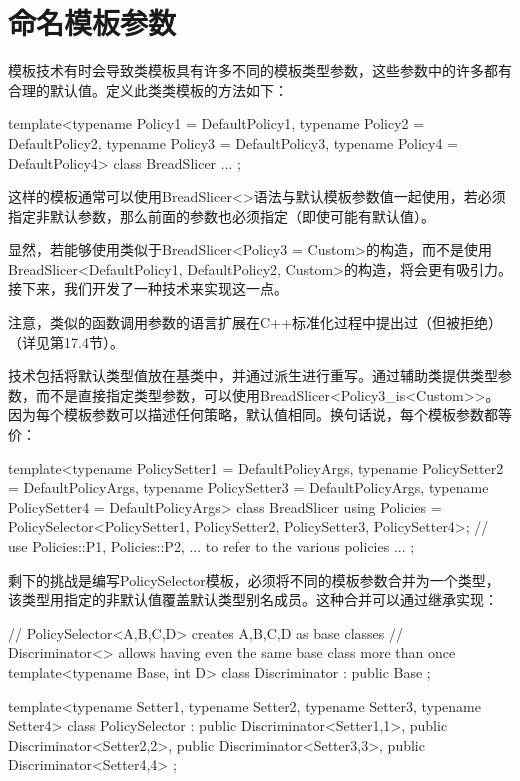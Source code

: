 \section{命名模板参数}
模板技术有时会导致类模板具有许多不同的模板类型参数，这些参数中的许多都有合理的默认值。定义此类类模板的方法如下：

\begin{cpp}
template<typename Policy1 = DefaultPolicy1,
		typename Policy2 = DefaultPolicy2,
		typename Policy3 = DefaultPolicy3,
		typename Policy4 = DefaultPolicy4>
class BreadSlicer {
	...
};
\end{cpp}

这样的模板通常可以使用BreadSlicer<>语法与默认模板参数值一起使用，若必须指定非默认参数，那么前面的参数也必须指定（即使可能有默认值）。

显然，若能够使用类似于BreadSlicer<Policy3 = Custom>的构造，而不是使用BreadSlicer<DefaultPolicy1, DefaultPolicy2, Custom>的构造，将会更有吸引力。接下来，我们开发了一种技术来实现这一点。

\begin{notice}
注意，类似的函数调用参数的语言扩展在C++标准化过程中提出过（但被拒绝）（详见第17.4节）。
\end{notice}

技术包括将默认类型值放在基类中，并通过派生进行重写。通过辅助类提供类型参数，而不是直接指定类型参数，可以使用BreadSlicer<Policy3\_is<Custom>{}>。因为每个模板参数可以描述任何策略，默认值相同。换句话说，每个模板参数都等价：

\begin{cpp}
template<typename PolicySetter1 = DefaultPolicyArgs,
		typename PolicySetter2 = DefaultPolicyArgs,
		typename PolicySetter3 = DefaultPolicyArgs,
		typename PolicySetter4 = DefaultPolicyArgs>
class BreadSlicer {
	using Policies = PolicySelector<PolicySetter1, PolicySetter2,
									PolicySetter3, PolicySetter4>;
	// use Policies::P1, Policies::P2, ... to refer to the various policies
	...
};
\end{cpp}

剩下的挑战是编写PolicySelector模板，必须将不同的模板参数合并为一个类型，该类型用指定的非默认值覆盖默认类型别名成员。这种合并可以通过继承实现：

\begin{cpp}
// PolicySelector<A,B,C,D> creates A,B,C,D as base classes
// Discriminator<> allows having even the same base class more than once
template<typename Base, int D>
class Discriminator : public Base {};

template<typename Setter1, typename Setter2,
		typename Setter3, typename Setter4>
class PolicySelector : public Discriminator<Setter1,1>,
						public Discriminator<Setter2,2>,
						public Discriminator<Setter3,3>,
						public Discriminator<Setter4,4> {};
\end{cpp}

